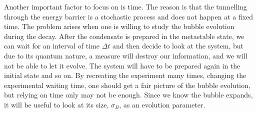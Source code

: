 Another important factor to focus on is time. The reason is that the tunnelling through the energy barrier is a stochastic process and does not happen at a fixed time. The problem arises when one is willing to study the bubble evolution during the decay. After the condensate is prepared in the metastable state, we can wait for an interval of time $\Delta t$ and then decide to look at the system, but due to its quantum nature, a measure will destroy our information, and we will not be able to let it evolve. The system will have to be prepared again in the initial state and so on. By recreating the experiment many times, changing the experimental waiting time, one should get a fair picture of the bubble evolution, but relying on time only may not be enough. Since we know the bubble expands, it will be useful to look at its size, $\sigma_B$, as an evolution parameter.




